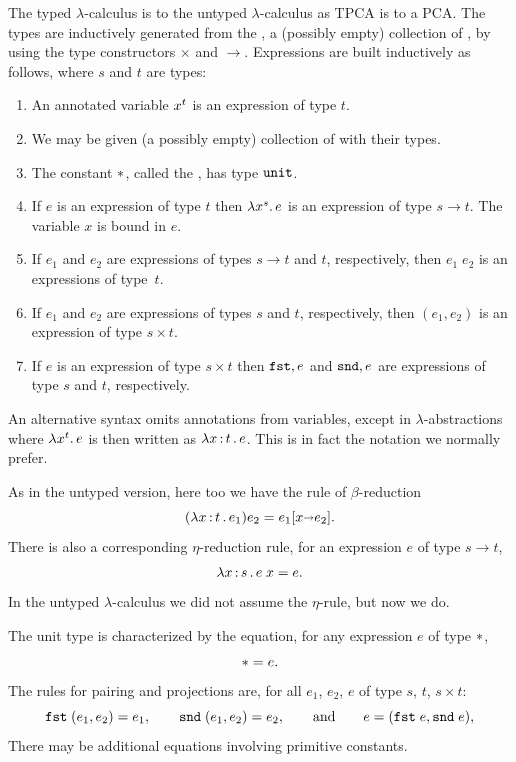 The typed $\lambda$-calculus is to the untyped $\lambda$-calculus as
TPCA is to a PCA. The types are inductively generated from the
, a (possibly empty) collection of
, by using the type constructors $\times$ and
$\to$. Expressions are built inductively as follows, where $s$ and $t$
are types:
%
\begin{enumerate}
\item An annotated variable $x^{t}$ is an expression of type
  $t$.
\item We may be given (a possibly empty) collection of  with their types.
\item The constant ${*}$, called the , has type
  $\mathtt{unit}$.
\item If $e$ is an expression of type $t$ then
  $\lambda x^{s} .\,e$ is an expression of type $s \to t$. The
  variable $x$ is bound in $e$.
\item If $e_1$ and $e_2$ are expressions of types $s \to t$ and
  $t$, respectively, then $e_1\; e_2$ is an expressions of type~$t$.
\item If $e_1$ and $e_2$ are expressions of types $s$ and $t$,
  respectively, then $(e_1, e_2)$ is an expression of type $s \times
  t$.
\item If $e$ is an expression of type $s \times t$ then $\mathtt{fst},e$ and
  $\mathtt{snd},e$ are expressions of type $s$ and $t$, respectively.
\end{enumerate}
%
An alternative syntax omits annotations from variables, except in
$\lambda$-abstractions where $\lambda x^{t} .\,e$ is then written
as $\lambda x \,{:}\, t\,.\,e$. This is in fact the notation we normally prefer.

As in the untyped version, here too we have the rule of
$\beta$-reduction
%
\begin{equation*}
  (\lambda x \,{:}\, t\,.\,e_1) e_2 = e_1[x {\shortrightarrow} e_2].
\end{equation*}
%
There is also a corresponding $\eta$-reduction rule, for an expression
$e$ of type $s \to t$,
%
\begin{equation*}
  \lambda x \,{:}\, s\,.\,e\;x = e.
\end{equation*}
%
In the untyped $\lambda$-calculus we did not assume the $\eta$-rule,
but now we do.

The unit type is characterized by the equation, for any expression $e$
of type ${*}$,
%
\begin{equation*}
  {*} = e.
\end{equation*}
%
The rules for pairing and projections are, for all $e_1$, $e_2$, $e$
of type $s$, $t$, $s \times t$:
%
\begin{equation*}
  \mathtt{fst}\;(e_1, e_2) = e_1,
  \qquad
  \mathtt{snd}\;(e_1, e_2) = e_2,
  \qquad\text{and}\qquad
  e = (\mathtt{fst}\;e, \mathtt{snd}\;e),
\end{equation*}
%
There may be additional equations involving primitive constants.

